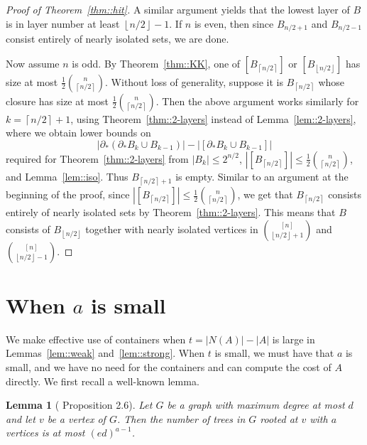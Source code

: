 \documentclass[12pt]{article}
\newcommand{\floor}[1]{\left\lfloor#1\right\rfloor}
\newcommand{\ceil}[1]{\left\lceil#1\right\rceil}
\newtheorem{lemma}[theorem]{Lemma}
\begin{document}
\begin{proof}[Proof of Theorem~\ref{thm::hit}]
A similar argument yields that the lowest layer of $B$ is in layer number at least $\floor{n/2}-1$. If $n$ is even, then since $B_{n/2+1}$ and $B_{n/2-1}$ consist entirely of nearly isolated sets, we are done.

Now assume $n$ is odd. By Theorem~\ref{thm::KK}, one of $[B_{\ceil{n/2}}]$ or $[B_{\floor{n/2}}]$ has size at most $\frac{1}{2} \binom{n}{\ceil{n/2}}$. Without loss of generality, suppose it is $B_{\ceil{n/2}}$ whose closure has size at most $\frac{1}{2} \binom{n}{\ceil{n/2}}$. Then the above argument works similarly for $k=\ceil{n/2}+1$, using Theorem~\ref{thm::2-layers} instead of Lemma~\ref{lem::2-layers}, where we obtain lower bounds on
\[ |\partial_*(\partial_* B_k \cup B_{k-1})| - |[\partial_* B_k \cup B_{k-1}]| \]
required for Theorem~\ref{thm::2-layers} from $|B_k| \leq 2^{n/2}$, $|[B_{\ceil{n/2}}]| \leq \frac{1}{2} \binom{n}{\ceil{n/2}}$, and Lemma~\ref{lem::iso}. Thus $B_{\ceil{n/2}+1}$ is empty. Similar to an argument at the beginning of the proof, since $|[B_{\ceil{n/2}}]| \leq \frac{1}{2} \binom{n}{\ceil{n/2}}$, we get that $B_{\ceil{n/2}}$ consists entirely of nearly isolated sets by Theorem~\ref{thm::2-layers}. This means that $B$ consists of $B_{\floor{n/2}}$ together with nearly isolated vertices in $\binom{[n]}{\floor{n/2}+1}$ and $\binom{[n]}{\floor{n/2}-1}$.
\end{proof}












\section{When \texorpdfstring{$a$}{a} is small}\label{sec::large-delta}

We make effective use of containers when $t = |N(A)|-|A|$ is large in Lemmas~\ref{lem::weak} and~\ref{lem::strong}. When $t$ is small, we must have that $a$ is small, and we have no need for the containers and can compute the cost of $A$ directly. We first recall a well-known lemma.

\begin{lemma}[\cite{HK2} Proposition 2.6]\label{lem::2-linked cost}
Let $G$ be a graph with maximum degree at most $d$ and let $v$ be a vertex of $G$. Then the number of trees in $G$ rooted at $v$ with $a$ vertices is at most $(ed)^{a-1}$.
\end{lemma}
\end{document}
